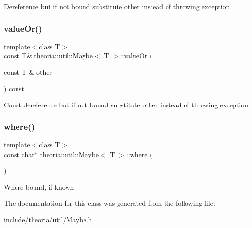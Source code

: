 Dereference but if not bound substitute other instead of throwing exception \mbox{\label{classtheoria_1_1util_1_1Maybe_aabda3ca7f3ffd841653ae0f9dff29c8e}} 
\subsubsection{\texorpdfstring{value\+Or()}{valueOr()}\hspace{0.1cm}{\footnotesize\ttfamily [2/2]}}
{\footnotesize\ttfamily template$<$class T$>$ \\
const T\& \hyperlink{classtheoria_1_1util_1_1Maybe}{theoria\+::util\+::\+Maybe}$<$ T $>$\+::value\+Or (\begin{DoxyParamCaption}\item[{const T \&}]{other }\end{DoxyParamCaption}) const\hspace{0.3cm}{\ttfamily [inline]}}

Const dereference but if not bound substitute other instead of throwing exception \mbox{\label{classtheoria_1_1util_1_1Maybe_a2dbc83104aa3cac55f043e468ef3e86f}} 
\subsubsection{\texorpdfstring{where()}{where()}}
{\footnotesize\ttfamily template$<$class T$>$ \\
const char$\ast$ \hyperlink{classtheoria_1_1util_1_1Maybe}{theoria\+::util\+::\+Maybe}$<$ T $>$\+::where (\begin{DoxyParamCaption}{ }\end{DoxyParamCaption})\hspace{0.3cm}{\ttfamily [inline]}}

Where bound, if known 

The documentation for this class was generated from the following file\+:\begin{DoxyCompactItemize}
\item 
include/theoria/util/Maybe.\+h\end{DoxyCompactItemize}
